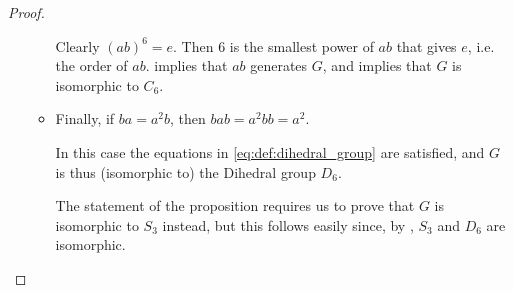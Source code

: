\begin{proof}
\begin{itemize}
\begin{itemize}
      Clearly \( (ab)^6 = e \). Then \( 6 \) is the smallest power of \( ab \) that gives \( e \), i.e. the order of \( ab \).  implies that \( ab \) generates \( G \), and  implies that \( G \) is isomorphic to \( C_6 \).

      \item Finally, if \( ba = a^2 b \), then \( bab = a^2 bb = a^2 \).

      In this case the equations in \eqref{eq:def:dihedral_group} are satisfied, and \( G \) is thus (isomorphic to) the Dihedral group \( D_6 \).

      The statement of the proposition requires us to prove that \( G \) is isomorphic to \( S_3 \) instead, but this follows easily since, by , \( S_3 \) and \( D_6 \) are isomorphic.
    \end{itemize}
  \end{itemize}
\end{proof}
